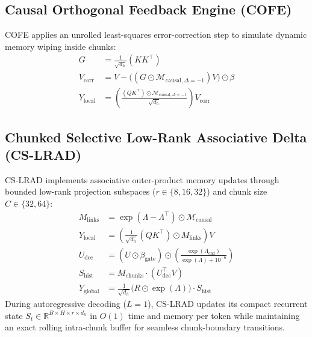 \documentclass[twocolumn,10pt]{article}
\begin{document}
\subsection{Causal Orthogonal Feedback Engine (COFE)}
COFE applies an unrolled least-squares error-correction step to simulate dynamic memory wiping inside chunks:
\begin{align*}
G &= \frac{1}{\sqrt{d_h}} (K K^\top) \\
V_{\text{corr}} &= V - \Big( (G \odot \mathcal{M}_{\text{causal}, \Delta=-1}) V \Big) \odot \beta \\
Y_{\text{local}} &= \left( \frac{(Q K^\top) \odot \mathcal{M}_{\text{causal}, \Delta=-1}}{\sqrt{d_h}} \right) V_{\text{corr}}
\end{align*}

\subsection{Chunked Selective Low-Rank Associative Delta (CS-LRAD)}
CS-LRAD implements associative outer-product memory updates through bounded low-rank projection subspaces ($r \in \{8, 16, 32\}$) and chunk size $C \in \{32, 64\}$:
\begin{align*}
M_{\text{links}} &= \exp(\Lambda - \Lambda^\top) \odot \mathcal{M}_{\text{causal}} \\
Y_{\text{local}} &= \left( \frac{1}{\sqrt{d_h}} (Q K^\top) \odot M_{\text{links}} \right) V \\
U_{\text{dec}} &= (U \odot \beta_{\text{gate}}) \odot \left( \frac{\exp(\Lambda_{\text{end}})}{\exp(\Lambda) + 10^{-6}} \right) \\
S_{\text{hist}} &= M_{\text{chunks}} \cdot (U_{\text{dec}}^\top V) \\
Y_{\text{global}} &= \frac{1}{\sqrt{d_h}} \big(R \odot \exp(\Lambda)\big) \cdot S_{\text{hist}}
\end{align*}
During autoregressive decoding ($L=1$), CS-LRAD updates its compact recurrent state $S_t \in \mathbb{R}^{B \times H \times r \times d_h}$ in $O(1)$ time and memory per token while maintaining an exact rolling intra-chunk buffer for seamless chunk-boundary transitions.
\end{document}
